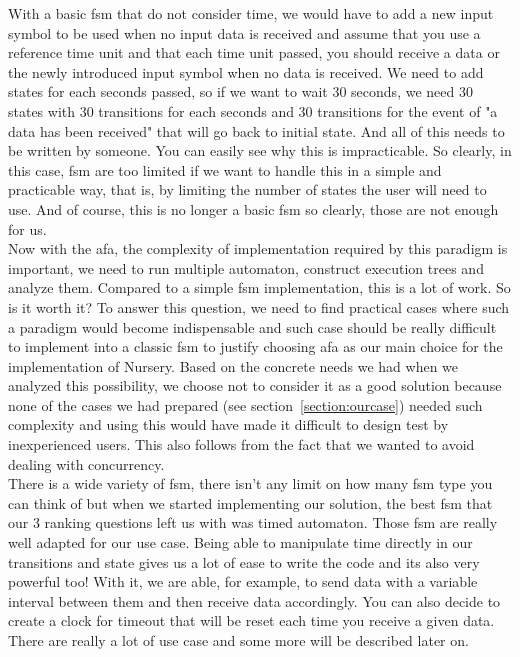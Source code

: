 \documentclass[12pt]{article}
\theoremstyle{definition}
\theoremstyle{definition}
\theoremstyle{remark}
\begin{document}
With a basic \gls{fsm} that do not consider time, we would have to add a new input symbol to be used when no input data is received and assume that you use a reference time unit and that each time unit passed, you should receive a data or the newly introduced input symbol when no data is received. We need to add states for each seconds passed, so if we want to wait 30 seconds, we need 30 states with 30 transitions for each seconds and 30 transitions for the event of "a data has been received" that will go back to initial state. And all of this needs to be written by someone. You can easily see why this is impracticable. So clearly, in this case, \gls{fsm} are too limited if we want to handle this in a simple and practicable way, that is, by limiting the number of states the user will need to use. And of course, this is no longer a basic \gls{fsm} so clearly, those are not enough for us.\\

Now with the \gls{afa}, the complexity of implementation required by this paradigm is important, we need to run multiple automaton, construct execution trees and analyze them. Compared to a simple \gls{fsm} implementation, this is a lot of work. So is it worth it? To answer this question, we need to find practical cases where such a paradigm would become indispensable and such case should be really difficult to implement into a classic \gls{fsm} to justify choosing \gls{afa} as our main choice for the implementation of Nursery. Based on the concrete needs we had when we analyzed this possibility, we choose not to consider it as a good solution because none of the cases we had prepared (see section~\ref{section:ourcase}) needed such complexity and using this would have made it difficult to design test by inexperienced users. This also follows from the fact that we wanted to avoid dealing with concurrency.\\

There is a wide variety of \gls{fsm}, there isn't any limit on how many \gls{fsm} type you can think of but when we started implementing our solution, the best \gls{fsm} that our 3 ranking questions left us with was timed automaton. Those \gls{fsm} are really well adapted for our use case. Being able to manipulate time directly in our transitions and state gives us a lot of ease to write the code and its also very powerful too! With it, we are able, for example, to send data with a variable interval between them and then receive data accordingly. You can also decide to create a clock for timeout that will be reset each time you receive a given data. There are really a lot of use case and some more will be described later on.\\
\end{document}
